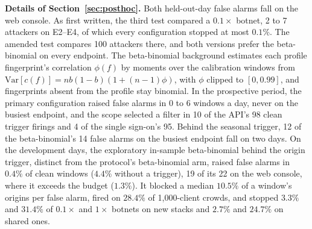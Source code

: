 \documentclass[conference,letterpaper,10pt]{IEEEtran}
\newcommand\1{\textit{(i)}}
\newcommand\2{\textit{(ii)}}
\newcommand\3{\textit{(iii)}}
\newcommand\4{\textit{(iv)}}
\newcommand\5{\textit{(v)}}
\newcommand\6{\textit{(vi)}}
\newcommand\7{\textit{(vii)}}
\newcommand\8{\textit{(viii)}}
\newcommand\9{\textit{(ix)}}
\begin{document}
\textbf{Details of Section~\ref{sec:posthoc}.} Both held-out-day false alarms fall on the web console. As first written, the third test compared a $0.1\times$ botnet, 2 to 7 attackers on E2--E4, of which every configuration stopped at most $0.1\%$. The amended test compares 100 attackers there, and both versions prefer the beta-binomial on every endpoint. The beta-binomial background estimates each profile fingerprint's correlation $\phi(f)$ by moments over the calibration windows from $\mathrm{Var}[c(f)]=nb(1-b)(1+(n-1)\phi)$, with $\phi$ clipped to $[0,0.99]$, and fingerprints absent from the profile stay binomial. In the prospective period, the primary configuration raised false alarms in 0 to 6 windows a day, never on the busiest endpoint, and the scope selected a filter in 10 of the API's 98 clean trigger firings and 4 of the single sign-on's 95.  Behind the seasonal trigger, 12 of the beta-binomial's 14 false alarms on the busiest endpoint fall on two days. On the development days, the exploratory in-sample beta-binomial behind the origin trigger, distinct from the protocol's beta-binomial arm, raised false alarms in $0.4\%$ of clean windows ($4.4\%$ without a trigger), 19 of its 22 on the web console, where it exceeds the budget ($1.3\%$). It blocked a median $10.5\%$ of a window's origins per false alarm, fired on $28.4\%$ of 1,000-client crowds, and stopped $3.3\%$ and $31.4\%$ of $0.1\times$ and $1\times$ botnets on new stacks and $2.7\%$ and $24.7\%$ on shared ones.
\end{document}

